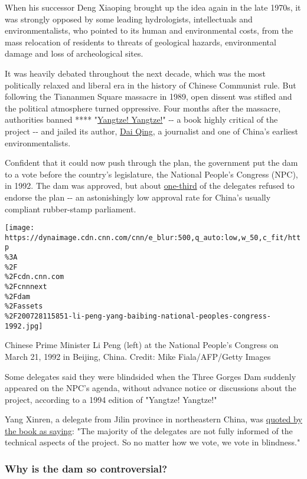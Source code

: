 When his successor Deng Xiaoping brought up the idea again in the late
1970s, it was strongly opposed by some leading hydrologists,
intellectuals and environmentalists, who pointed to its human and
environmental costs, from the mass relocation of residents to threats of
geological hazards, environmental damage and loss of archeological
sites.

It was heavily debated throughout the next decade, which was the most
politically relaxed and liberal era in the history of Chinese Communist
rule. But following the Tiananmen Square massacre in 1989, open dissent
was stifled and the political atmosphere turned oppressive. Four months
after the massacre, authorities banned ****
"\href{https://journal.probeinternational.org/three-gorges-probe/yangtze-yangtze/}{Yangtze!
Yangtze!}" -\/- a book highly critical of the project -\/- and jailed
its author, \href{https://www.goldmanprize.org/recipient/dai-qing/}{Dai
Qing}, a journalist and one of China's earliest environmentalists.

Confident that it could now push through the plan, the government put
the dam to a vote before the country's legislature, the National
People's Congress (NPC), in 1992. The dam was approved, but about
\href{http://www.gov.cn/xinwen/2014-12/13/content_2790541.htm}{one-third}
of the delegates refused to endorse the plan -\/- an astonishingly low
approval rate for China's usually compliant rubber-stamp parliament.

\texttt{[image: https://dynaimage.cdn.cnn.com/cnn/e\_blur:500,q\_auto:low,w\_50,c\_fit/http\\\%3A\\\%2F\\\%2Fcdn.cnn.com\\\%2Fcnnnext\\\%2Fdam\\\%2Fassets\\\%2F200728115851-li-peng-yang-baibing-national-peoples-congress-1992.jpg]}

Chinese Prime Minister Li Peng (left) at the National People's Congress
on March 21, 1992 in Beijing, China. Credit: Mike Fiala/AFP/Getty Images

Some delegates said they were blindsided when the Three Gorges Dam
suddenly appeared on the NPC's agenda, without advance notice or
discussions about the project, according to a 1994 edition of "Yangtze!
Yangtze!"

Yang Xinren, a delegate from Jilin province in northeastern China, was
\href{https://journal.probeinternational.org/1994/05/31/chapter-3-2/}{quoted
by the book as saying}: "The majority of the delegates are not fully
informed of the technical aspects of the project. So no matter how we
vote, we vote in blindness."

\hypertarget{why-is-the-dam-so-controversial}{%
\subsubsection{Why is the dam so
controversial?}\label{why-is-the-dam-so-controversial}}

